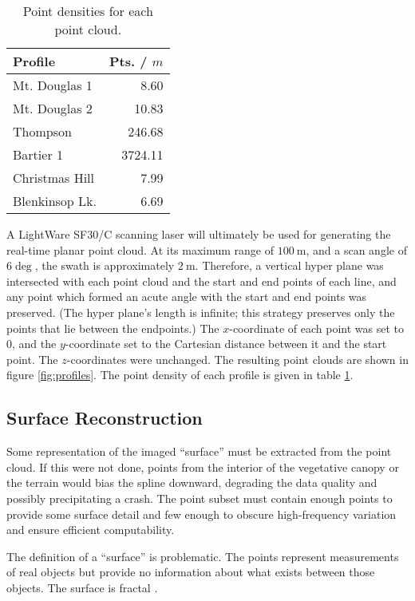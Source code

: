 \documentclass[doc]{apa6}
\begin{document}
\begin{table}
\caption{Point densities for each point cloud.}
\label{table:pt_density}
\begin{tabular}{l || r} 
Profile & Pts. / $m$ \\
\hline
Mt. Douglas 1  & 8.60 \\
Mt. Douglas 2  & 10.83 \\
Thompson       & 246.68 \\
Bartier 1      & 3724.11 \\
Christmas Hill & 7.99 \\
Blenkinsop Lk. & 6.69 \\
\end{tabular}
\end{table}


A LightWare SF30/C scanning laser will ultimately be used for generating the real-time planar point cloud. At its maximum range of $\SI{100}\m$, and a scan angle of $\SI{6}\deg$, the swath is approximately $\SI{2}\m$. Therefore, a vertical hyper plane was intersected with each point cloud and the start and end points of each line, and any point which formed an acute angle with the start and end points was preserved. (The hyper plane's length is infinite; this strategy preserves only the points that lie between the endpoints.) The $x$-coordinate of each point was set to $0$, and the $y$-coordinate set to the Cartesian distance between it and the start point. The $z$-coordinates were unchanged. The resulting point clouds are shown in figure \ref{fig:profiles}. The point density of each profile is given in table \ref{table:pt_density}.


\subsection{Surface Reconstruction}

Some representation of the imaged ``surface'' must be extracted from the point cloud. If this were not done, points from the interior of the vegetative canopy or the terrain would bias the spline downward, degrading the data quality and possibly precipitating a crash. The point subset must contain enough points to provide some surface detail and few enough to obscure high-frequency variation and ensure efficient computability. 

The definition of a ``surface'' is problematic. The points represent measurements of real objects but provide no information about what exists between those objects. The surface is fractal \parencite{Mandelbrot1967}.
\end{document}
